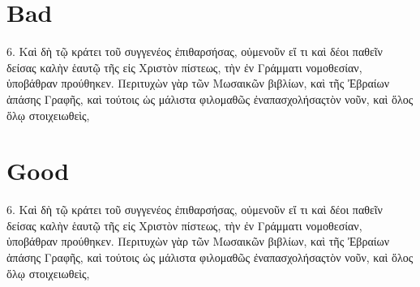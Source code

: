 \documentclass[a4paper]{book}
\makeatletter
\def\edtext#1{\Hy@raisedlink{}#1}
\makeatother
\begin{document}
\section{Bad}

6. Καὶ δὴ τῷ κράτει
	\edtext{τοῦ} \edtext{συγγενέος} \edtext{ἐπιθαρσήσας}, \edtext{οὐμενοῦν}
	\edtext{εἴ τι}
καὶ \edtext{δέοι}
παθεῖν
δείσας
καλὴν ἑαυτῷ
τῆς εἰς Χριστὸν πίστεως, τὴν ἐν
	\edtext{Γράμματι}
νομοθεσίαν,
ὑποβάθραν
	\edtext{προύθηκεν}.
	\edtext{Περιτυχὼν}
γὰρ
	\edtext{τῶν Μωσαικῶν}
	\edtext{βιβλίων},
καὶ
	\edtext{τῆς Ἐβραίων ἁπάσης Γραφῆς},
καὶ τούτοις ὡς μάλιστα φιλομαθῶς
	\edtext{ἐναπασχολήσας}τὸν νοῦν, καὶ
	\edtext{ὅλος}
	\edtext{ὅλῳ}
στοιχειωθεὶς,

\section{Good}

\def\edtext#1{#1}
6. Καὶ δὴ τῷ κράτει
	\edtext{τοῦ} \edtext{συγγενέος} \edtext{ἐπιθαρσήσας}, \edtext{οὐμενοῦν}
	\edtext{εἴ τι}
καὶ \edtext{δέοι}
παθεῖν
δείσας
καλὴν ἑαυτῷ
τῆς εἰς Χριστὸν πίστεως, τὴν ἐν
	\edtext{Γράμματι}
νομοθεσίαν,
ὑποβάθραν
	\edtext{προύθηκεν}.
	\edtext{Περιτυχὼν}
γὰρ
	\edtext{τῶν Μωσαικῶν}
	\edtext{βιβλίων},
καὶ
	\edtext{τῆς Ἐβραίων ἁπάσης Γραφῆς},
καὶ τούτοις ὡς μάλιστα φιλομαθῶς
	\edtext{ἐναπασχολήσας}τὸν νοῦν, καὶ
	\edtext{ὅλος}
	\edtext{ὅλῳ}
στοιχειωθεὶς,
\end{document}
